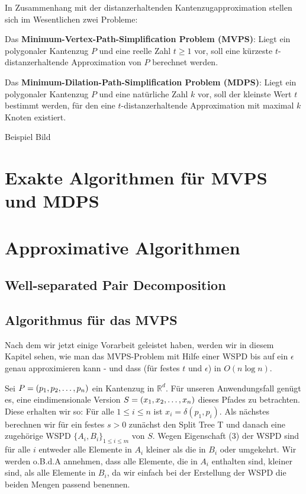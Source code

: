 \documentclass[11pt]{article}
\newcommand{\R}{\mathbb{R}}
\begin{document}
	In Zusammenhang mit der distanzerhaltenden Kantenzugapproximation stellen sich im Wesentlichen zwei Probleme:
	
	\noindent Das \textbf{Minimum-Vertex-Path-Simplification Problem (MVPS)}: Liegt ein polygonaler Kantenzug $P$ und eine reelle Zahl $t \geq 1$ vor, soll eine kürzeste $t$-distanzerhaltende Approximation von $P$ berechnet werden.
	
	\noindent Das \textbf{Minimum-Dilation-Path-Simplification Problem (MDPS)}: Liegt ein polygonaler Kantenzug $P$ und eine natürliche Zahl $k$ vor, soll der kleinste Wert $t$ bestimmt werden, für den eine $t$-distanzerhaltende Approximation mit maximal $k$ Knoten existiert.

    Beispiel Bild

    \section{Exakte Algorithmen für MVPS und MDPS}
    \label{sec:exact}
    
    
    \section{Approximative Algorithmen}
    \label{sec:approximative}
    

    \subsection{Well-separated Pair Decomposition}
    \label{subsec:wspd}
    
    
    \subsection{Algorithmus für das MVPS}
    \label{subsec:mvps}
    Nach dem wir jetzt einige Vorarbeit geleistet haben, werden wir in diesem Kapitel sehen, wie man das MVPS-Problem mit Hilfe einer WSPD bis auf ein $\epsilon$ genau approximieren kann - und dass (für festes $t$ und $\epsilon$) in $O(n\log n)$.
    
    Sei $P = (p_1, p_2, \mathellipsis, p_n)$ ein Kantenzug in $\R^d$. Für unseren Anwendungsfall genügt es, eine eindimensionale Version $S = (x_1, x_2, \mathellipsis, x_n)$ dieses Pfades zu betrachten. Diese erhalten wir so: Für alle $1 \leq i \leq n$ ist $x_i = \delta(p_1, p_i)$.
    Als nächstes berechnen wir für ein festes $s > 0$ zunächst den Split Tree T und danach eine zugehörige WSPD $\{A_i, B_i\}_{1 \leq i \leq m}$ von $S$. Wegen Eigenschaft (3) der WSPD sind für alle $i$ entweder alle Elemente in $A_i$ kleiner als die in $B_i$ oder umgekehrt. Wir werden o.B.d.A annehmen, dass alle Elemente, die in $A_i$ enthalten sind, kleiner sind, als alle Elemente in $B_i$, da wir einfach bei der Erstellung der WSPD die beiden Mengen passend benennen.
    
\end{document}
